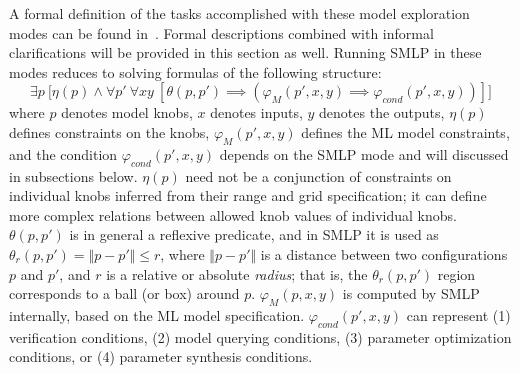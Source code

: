 \documentclass[a4paper,parskip=half]{article} %
\newcommand*\eqdef=
\begin{document}
A formal definition of the tasks accomplished with these model exploration modes can be found in~\cite{brausse2024smlp}. 
Formal descriptions combined with informal clarifications will be provided in this section as well. 
Running SMLP in these modes reduces to solving formulas of the following structure:
\begin{equation}\label{form:gear:final}
    \exists p ~\big[ \eta(p) \wedge
    \forall p'~
    \forall x y~[
    \theta(p,p') \implies (\varphi_M(p',x,y)  \implies  \varphi_{\mathit{cond}}(p',x,y))
    ]\big]
\end{equation}
where $p$ denotes model knobs, $x$ denotes inputs, $y$ denotes the outputs, $\eta(p)$ defines 
constraints on the knobs,  $\varphi_M(p',x,y)$ defines the ML model constraints, and the condition
$\varphi_{\mathit{cond}}(p',x,y)$ depends on the SMLP mode and will discussed in subsections below.
$\eta(p)$ need not be a conjunction of constraints on individual knobs inferred from their range and grid
specification; it can define more complex relations between allowed knob values of individual knobs.
$\theta(p,p')$ is in general a reflexive predicate, and in SMLP it is used as 
$\theta_r(p, p') \eqdef \Vert p - p' \Vert \leq r$, where  $\Vert p - p' \Vert$ is a distance between 
two configurations $p$ and $p'$, and $r$ is a relative or absolute \emph{radius}; that is, 
the $\theta_r(p, p')$ region corresponds to a ball (or box) around $p$.
$\varphi_M(p,x,y)$ is computed by SMLP internally, based on the ML model specification.
$\varphi_{\mathit{cond}}(p',x,y)$  can represent (1) verification conditions, (2) model querying conditions, 
(3) parameter optimization conditions, or (4) parameter synthesis conditions.
\end{document}
